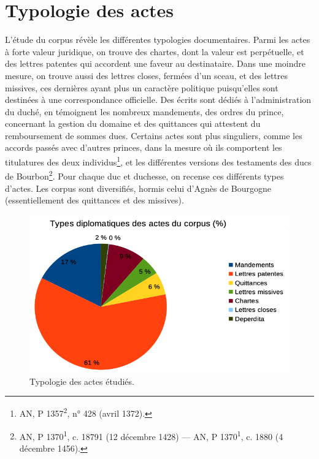 \section{Typologie des actes}
\label{I.1.3}

\par L'étude du corpus révèle les différentes typologies documentaires. Parmi les actes à forte valeur juridique, on trouve des chartes, dont la valeur est perpétuelle, et des lettres patentes qui accordent une faveur au destinataire. Dans une moindre mesure, on trouve aussi des lettres closes, fermées d'un sceau, et des lettres missives, ces dernières ayant plus un caractère politique puisqu'elles sont destinées à une correspondance officielle. Des écrits sont dédiés à l'administration du duché, en témoignent les nombreux mandements, des ordres du prince, concernant la gestion du domaine et des quittances qui attestent du remboursement de sommes dues. Certains actes sont plus singuliers, comme les accords passés avec d'autres princes, dans la mesure où ils comportent les titulatures des deux individus\footnote{AN, P 1357\textsuperscript{2}, n° 428 (avril 1372).}, et les différentes versions des testaments des ducs de Bourbon\footnote{AN, P 1370\textsuperscript{1}, c. 18791 (12 décembre 1428) — AN, P 1370\textsuperscript{1}, c. 1880 (4 décembre 1456).}. Pour chaque duc et duchesse, on recense ces différents types d'actes. Les corpus sont diversifiés, hormis celui d'Agnès de Bourgogne (essentiellement des quittances et des missives). 
\newline 

\begin{figure}[ht]
\centering
\includegraphics[scale=0.6]{front/images/typologie_documentaire.png}
\caption{Typologie des actes étudiés.}
\label{fig:typo_actes}
\end{figure}
\newpage 

